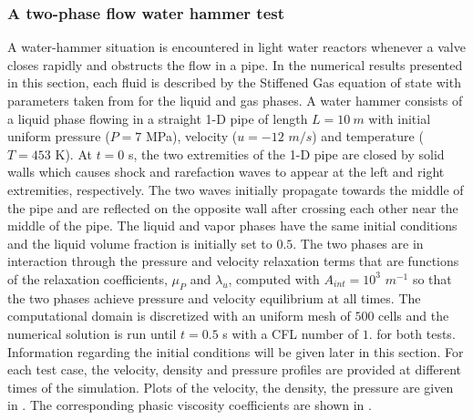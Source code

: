 \documentclass[preprint,10pt]{elsarticle}
\begin{document}
\subsubsection{A two-phase flow water hammer test}\label{sec:water-hammer}
%
A water-hammer situation is encountered in light water reactors whenever a valve closes rapidly and obstructs the flow in a pipe. In the numerical results presented in this section, each fluid is described by the Stiffened Gas equation of state with parameters taken from  for the liquid and gas phases. 
A water hammer consists of a liquid phase flowing in a straight 1-D pipe of length $L=10 \ m$ with initial uniform pressure ($P = 7$ MPa), velocity ($u = -12$ $m/s$) and temperature ($T = 453$ K). At $t=0$ s, the two extremities of the 1-D pipe are closed by solid walls which causes shock and rarefaction waves to appear at the left and right extremities, respectively. The two waves initially propagate towards the middle of the pipe and are reflected on the opposite wall after crossing each other near the middle of the pipe.
The liquid and vapor phases have the same initial conditions and the liquid volume fraction is initially set to $0.5$. The two phases are in interaction through the pressure and velocity relaxation terms that are functions of the relaxation coefficients, $\mu_P$ and $\lambda_u$, computed with $A_{int} = 10^3$ $m^{-1}$ so that the two phases achieve pressure and velocity equilibrium at all times.
The computational domain is discretized with an uniform mesh of $500$ cells and the numerical solution is run until $t = 0.5$ s with a CFL number of $1.$ for both tests. Information regarding the initial conditions will be given later in this section. 
For each test case, the velocity, density and pressure profiles are provided at different times of the simulation. Plots of the velocity, the density, the pressure are given in . The corresponding phasic viscosity coefficients are shown in .
%
\end{document}
